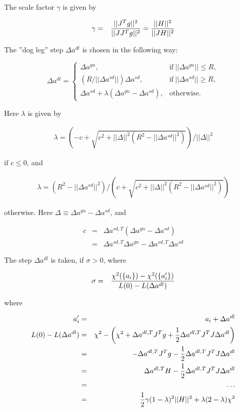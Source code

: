 \documentclass[a4paper,12pt,onecolumn]{article}
\begin{document}
The scale factor $\gamma$ is given by

\begin{eqnarray}
\gamma &=&
{||J^T g||^2 \over ||J J^T g||^2}
=
{||H||^2 \over ||J H||^2}
\end{eqnarray}

The ''dog leg'' step $\Delta a^{dl}$ is chosen in the following way:

\begin{equation}
\Delta a^{dl} =
\left\{
\begin{array}{ll}
\Delta a^{gn}, & \mathrm{if\ }||\Delta a^{gn}|| \leq R,\\
(R / ||\Delta a^{sd}||) \Delta a^{sd}, & \mathrm{if\ }||\Delta a^{sd}|| \geq R, \\
\Delta a^{sd} + \lambda (\Delta a^{gn} - \Delta a^{sd}), & \mathrm{otherwise}.
\end{array}
\right.
\end{equation}



Here $\lambda$ is given by

\begin{eqnarray}
\lambda = \left(-c + \sqrt{c^2 + ||\Delta||^2 (R^2 - ||\Delta a^{sd}||^2)} \right) /
||\Delta||^2
\end{eqnarray}

if $c \leq 0$, and

\begin{eqnarray}
\lambda = \left( R^2 - ||\Delta a^{sd}||^2 \right)
/ \left(
c + \sqrt{c^2 + ||\Delta||^2 (R^2 - ||\Delta a^{sd}||^2)}
\right)
\end{eqnarray}

otherwise. Here $\Delta \equiv \Delta a^{gn} - \Delta a^{sd}$, and

\begin{eqnarray}
c &=&  \Delta a^{sd, T} (\Delta a^{gn} - \Delta a^{sd}) \\
  &=&  \Delta a^{sd, T} \Delta a^{gn} - \Delta a^{sd, T} \Delta a^{sd}
\end{eqnarray}



The step $\Delta a^{dl}$ is taken, if $\sigma > 0$, where

\begin{eqnarray}
\sigma &=&
{\chi^2(\{a_i\}) - \chi^2(\{a'_i\})
\over
L(0) - L(\Delta a^{dl})}
\end{eqnarray}

where

\begin{eqnarray}
a'_i &=& a_i + \Delta a^{dl} \\
L(0) - L(\Delta a^{dl})
  &=&
\chi^2 - \left(
\chi^2 + \Delta a^{dl, T} J^T g + {1 \over 2} \Delta a^{dl,T} J^T J \Delta a^{dl}
\right) \\
  &=&
- \Delta a^{dl, T} J^T g - {1 \over 2} \Delta a^{dl,T} J^T J \Delta a^{dl} \\
  &=&
 \Delta a^{dl, T} H - {1 \over 2} \Delta a^{dl,T} J^T J \Delta a^{dl} \\
  &=&
\ldots \\
  &=&
{1 \over 2} \gamma (1-\lambda)^2 ||H||^2 + \lambda (2-\lambda) \chi^2
\end{eqnarray}
\end{document}
